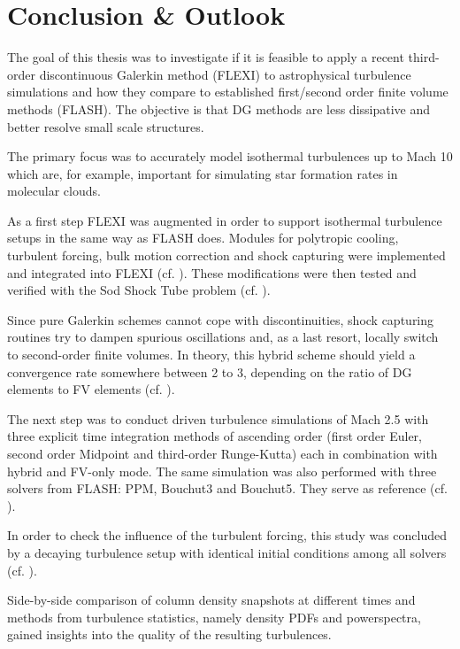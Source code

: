 \section{Conclusion \& Outlook}
The goal of this thesis was to investigate if it is feasible to apply a
recent third-order discontinuous Galerkin method (FLEXI) to astrophysical
turbulence simulations and how they compare to established first/second order
finite volume methods (FLASH). The objective is that DG methods are less
dissipative and better resolve small scale structures.

The primary focus was to accurately model isothermal turbulences up to Mach 10
which are, for example, important for simulating star formation rates in
molecular clouds.

As a first step FLEXI was augmented in order to support isothermal turbulence
setups in the same way as FLASH does. Modules for polytropic cooling, turbulent
forcing, bulk motion correction and shock capturing were implemented and
integrated into FLEXI (cf. ). These
modifications were then tested and verified with the Sod Shock Tube problem
(cf. ).

Since pure Galerkin schemes cannot cope with discontinuities, shock
capturing routines try to dampen spurious oscillations and, as a last resort,
locally switch to second-order finite volumes. In theory, this hybrid scheme
should yield a convergence rate somewhere between 2 to 3, depending on the
ratio of DG elements to FV elements (cf. ).

The next step was to conduct driven turbulence simulations of Mach 2.5 with
three explicit time integration methods of ascending order (first order Euler,
second order Midpoint and third-order Runge-Kutta) each in combination with
hybrid and FV-only mode. The same simulation was also performed with three
solvers from FLASH: PPM, Bouchut3 and Bouchut5. They serve as reference
(cf. ).

In order to check the influence of the turbulent forcing, this study was
concluded by a decaying turbulence setup with identical initial conditions
among all solvers (cf. ).

Side-by-side comparison of column density snapshots at different times and
methods from turbulence statistics, namely density PDFs and powerspectra,
gained insights into the quality of the resulting turbulences.

